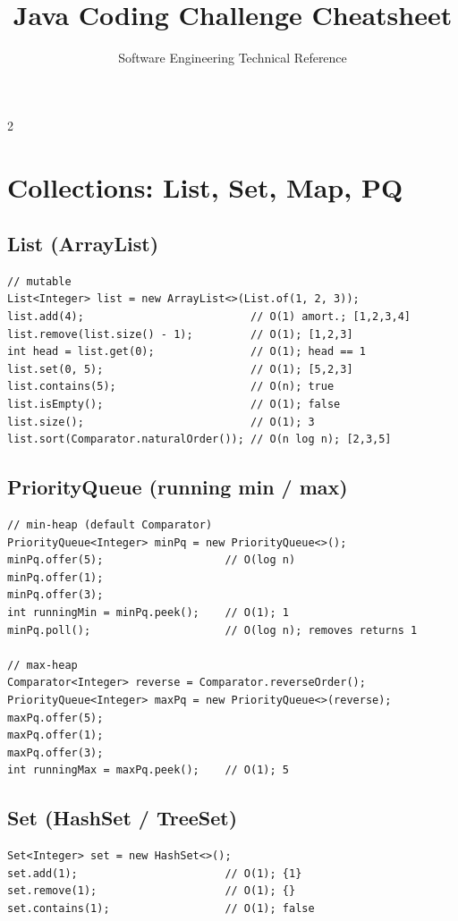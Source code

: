 \documentclass{article}
\title{Java Coding Challenge Cheatsheet}
\author{Software Engineering Technical Reference}
\date{}
\begin{document}

\begin{multicols}{2}




\section{Collections: List, Set, Map, PQ}

\subsection{List (ArrayList)}
\begin{lstlisting}
// mutable
List<Integer> list = new ArrayList<>(List.of(1, 2, 3));
list.add(4);                          // O(1) amort.; [1,2,3,4]
list.remove(list.size() - 1);         // O(1); [1,2,3]
int head = list.get(0);               // O(1); head == 1
list.set(0, 5);                       // O(1); [5,2,3]
list.contains(5);                     // O(n); true
list.isEmpty();                       // O(1); false
list.size();                          // O(1); 3
list.sort(Comparator.naturalOrder()); // O(n log n); [2,3,5]
\end{lstlisting}

\subsection{PriorityQueue (running min / max)}
\begin{lstlisting}
// min-heap (default Comparator)
PriorityQueue<Integer> minPq = new PriorityQueue<>();
minPq.offer(5);                   // O(log n)
minPq.offer(1);
minPq.offer(3);
int runningMin = minPq.peek();    // O(1); 1
minPq.poll();                     // O(log n); removes returns 1

// max-heap
Comparator<Integer> reverse = Comparator.reverseOrder();
PriorityQueue<Integer> maxPq = new PriorityQueue<>(reverse);
maxPq.offer(5);
maxPq.offer(1);
maxPq.offer(3);
int runningMax = maxPq.peek();    // O(1); 5
\end{lstlisting}

\subsection{Set (HashSet / TreeSet)}
\begin{lstlisting}
Set<Integer> set = new HashSet<>();
set.add(1);                       // O(1); {1}
set.remove(1);                    // O(1); {}
set.contains(1);                  // O(1); false


\end{lstlisting}
\end{multicols}
\end{document}

